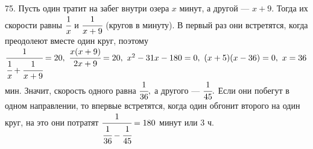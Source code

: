 75. Пусть один тратит на забег внутри озера $x$ минут, а другой --- $x+9.$ Тогда их скорости равны $\cfrac{1}{x}$ и $\cfrac{1}{x+9}$ (кругов в минуту). В первый раз они встретятся, когда преодолеют вместе один круг, поэтому $\cfrac{1}{\cfrac{1}{x}+\cfrac{1}{x+9}}=20,\ \cfrac{x(x+9)}{2x+9}=20,\
x^2-31x-180=0,\ (x+5)(x-36)=0,\ x=36$мин. Значит, скорость одного равна $\cfrac{1}{36},$ а другого --- $\cfrac{1}{45}.$ Если они побегут в одном направлении, то впервые встретятся, когда один обгонит второго на один круг, на это они потратят $\cfrac{1}{\cfrac{1}{36}-\cfrac{1}{45}}=180$ минут или 3 ч.\\
